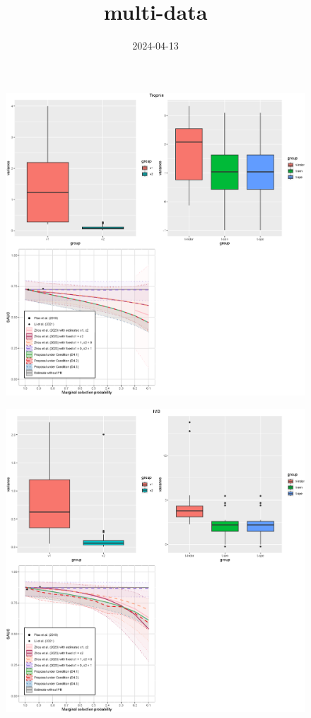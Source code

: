\documentclass[
]{article}
\title{multi-data}
\author{}
\date{\vspace{-2.5em}2024-04-13}
\begin{document}
\maketitle

\begin{figure}
\begin{center}
\centerline{\includegraphics[width=\textwidth]{var-trop.eps}}
\end{center}
\end{figure}

\begin{figure}
\begin{center}
\centerline{\includegraphics[width=\textwidth]{var-IVD.eps}}
\end{center}
\end{figure}
\end{document}
